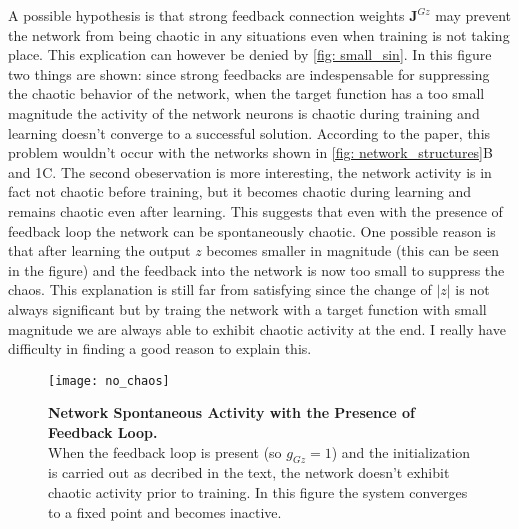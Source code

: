 A possible hypothesis is that strong feedback connection 
weights $\mathbf{J}^{Gz}$ may prevent the network from being chaotic
in any situations even when training is not taking place. This explication
can however be denied by \autoref{fig: small_sin}.
In this figure two things are shown: since strong feedbacks are
indespensable for suppressing the chaotic behavior of the network,
when the target function has a too small magnitude the activity
of the network neurons is chaotic during training and learning doesn't
converge to a successful solution. According to the paper, this problem
wouldn't occur with the networks shown in 
\autoref{fig: network_structures}B and 1C.
The second obeservation is more interesting, the network activity is in fact
not chaotic before training, but it becomes chaotic during learning and
remains chaotic even after learning. This suggests that even with the
presence of feedback loop the network can be spontaneously chaotic.
One possible reason is that after learning the output $z$ becomes
smaller in magnitude (this can be seen in the figure) and the feedback
into the network is now too small to suppress the chaos. This explanation
is still far from satisfying since the change of $|z|$ is not always 
significant but by traing the network with a target function with small
magnitude we are always able to exhibit chaotic activity at the end.
I really have difficulty in finding a good reason to explain this.

\begin{figure}[H]
  \centering
  \texttt{[image: no\_chaos]}
  \caption{
    \textbf{Network Spontaneous Activity with the Presence of Feedback Loop.}
    \\[0.1em]
    When the feedback loop is present (so $g_{Gz}=1$) and the initialization
    is carried out as decribed in the text, the network doesn't exhibit 
    chaotic activity prior to training. In this figure the system converges to
    a fixed point and becomes inactive.
  }
  \label{fig: no_chaos}
\end{figure}

\newpage

